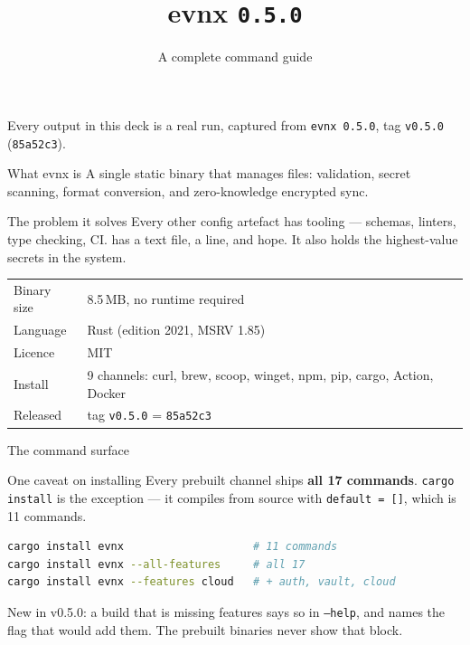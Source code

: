 \documentclass[aspectratio=169,10pt]{beamer}
\title{evnx \texttt{0.5.0}}
\subtitle{A complete command guide}
\author{}
\date{}
\begin{document}
\begin{frame}[plain]
  \titlepage
  \begin{center}\footnotesize
  \textcolor{evnxMuted}{Every output in this deck is a real run, captured from
  \texttt{evnx 0.5.0}, tag \texttt{v0.5.0} (\texttt{85a52c3}).}
  \end{center}
\end{frame}

\begin{frame}{What evnx is}
  A single static binary that manages  files: validation, secret
  scanning, format conversion, and zero-knowledge encrypted sync.

  \vspace{0.8em}
  \begin{block}{The problem it solves}
    Every other config artefact has tooling — schemas, linters, type checking,
    CI.  has a text file, a  line, and hope. It also
    holds the highest-value secrets in the system.
  \end{block}

  \vspace{0.6em}
  \begin{tabular}{@{}ll@{}}
    Binary size & 8.5\,MB, no runtime required \\
    Language    & Rust (edition 2021, MSRV 1.85) \\
    Licence     & MIT \\
    Install     & 9 channels: curl, brew, scoop, winget, npm, pip, cargo, Action, Docker \\
    Released    & tag \texttt{v0.5.0} = \texttt{85a52c3} \\
  \end{tabular}
\end{frame}

\begin{frame}[fragile]{The command surface}
\end{frame}

\begin{frame}[fragile]{One caveat on installing}
  Every prebuilt channel ships \textbf{all 17 commands}. \texttt{cargo install}
  is the exception --- it compiles from source with \texttt{default = []}, which
  is 11 commands.

  \vspace{0.5em}
\begin{lstlisting}[style=evnxcode,language=bash]
cargo install evnx                    # 11 commands
cargo install evnx --all-features     # all 17
cargo install evnx --features cloud   # + auth, vault, cloud
\end{lstlisting}

  \vspace{0.3em}
  {\footnotesize New in v0.5.0: a build that is missing features says so in
  \texttt{--help}, and names the flag that would add them. The prebuilt binaries
  never show that block.}
\end{frame}
\end{document}

